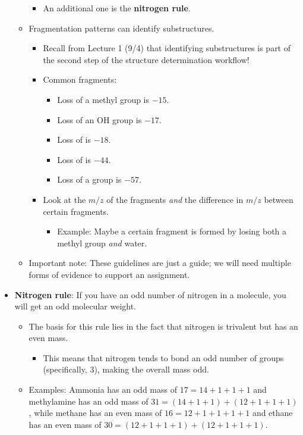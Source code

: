 \documentclass[../notes.tex]{subfiles}
\begin{document}
\begin{itemize}
\begin{itemize}
\begin{itemize}
            \item An additional one is the \textbf{nitrogen rule}.
        \end{itemize}
        \item Fragmentation patterns can identify substructures.
        \begin{itemize}
            \item Recall from Lecture 1 (9/4) that identifying substructures is part of the second step of the structure determination workflow!
            \item Common fragments:
            \begin{itemize}
                \item Loss of a methyl group is $-15$.
                \item Loss of an OH group is $-17$.
                \item Loss of  is $-18$.
                \item Loss of  is $-44$.
                \item Loss of a  group is $-57$.
            \end{itemize}
            \item Look at the $m/z$ of the fragments \emph{and} the difference in $m/z$ between certain fragments.
            \begin{itemize}
                \item Example: Maybe a certain fragment is formed by losing both a methyl group \emph{and} water.
            \end{itemize}
        \end{itemize}
        \item Important note: These guidelines are just a guide; we will need multiple forms of evidence to support an assignment.
    \end{itemize}
    \item \textbf{Nitrogen rule}: If you have an odd number of nitrogen in a molecule, you will get an odd molecular weight.
    \begin{itemize}
        \item The basis for this rule lies in the fact that nitrogen is trivalent but has an even mass.
        \begin{itemize}
            \item This means that nitrogen tends to bond an odd number of groups (specifically, 3), making the overall mass odd.
        \end{itemize}
        \item Examples: Ammonia has an odd mass of $17=14+1+1+1$ and methylamine has an odd mass of $31=(14+1+1)+(12+1+1+1)$, while methane has an even mass of $16=12+1+1+1+1$ and ethane has an even mass of $30=(12+1+1+1)+(12+1+1+1)$.

\end{itemize}
\end{itemize}
\end{document}
